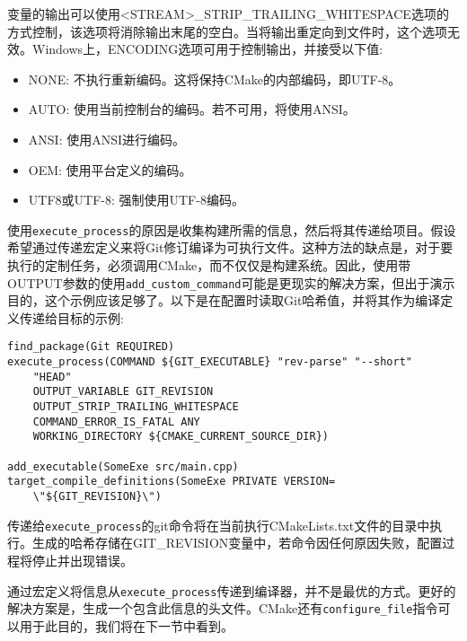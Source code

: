 变量的输出可以使用<STREAM>\_STRIP\_TRAILING\_WHITESPACE选项的方式控制，该选项将消除输出末尾的空白。当将输出重定向到文件时，这个选项无效。Windows上，ENCODING选项可用于控制输出，并接受以下值:

\begin{itemize}
\item 
NONE: 不执行重新编码。这将保持CMake的内部编码，即UTF-8。

\item 
AUTO: 使用当前控制台的编码。若不可用，将使用ANSI。

\item 
ANSI: 使用ANSI进行编码。

\item 
OEM: 使用平台定义的编码。

\item 
UTF8或UTF-8: 强制使用UTF-8编码。
\end{itemize}

使用\texttt{execute\_process}的原因是收集构建所需的信息，然后将其传递给项目。假设希望通过传递宏定义来将Git修订编译为可执行文件。这种方法的缺点是，对于要执行的定制任务，必须调用CMake，而不仅仅是构建系统。因此，使用带OUTPUT参数的使用\texttt{add\_custom\_command}可能是更现实的解决方案，但出于演示目的，这个示例应该足够了。以下是在配置时读取Git哈希值，并将其作为编译定义传递给目标的示例:

\begin{lstlisting}[style=styleCMake]
find_package(Git REQUIRED)
execute_process(COMMAND ${GIT_EXECUTABLE} "rev-parse" "--short"
	"HEAD"
	OUTPUT_VARIABLE GIT_REVISION
	OUTPUT_STRIP_TRAILING_WHITESPACE
	COMMAND_ERROR_IS_FATAL ANY
	WORKING_DIRECTORY ${CMAKE_CURRENT_SOURCE_DIR})

add_executable(SomeExe src/main.cpp)
target_compile_definitions(SomeExe PRIVATE VERSION=
	\"${GIT_REVISION}\")
\end{lstlisting}

传递给\texttt{execute\_process}的git命令将在当前执行CMakeLists.txt文件的目录中执行。生成的哈希存储在GIT\_REVISION变量中，若命令因任何原因失败，配置过程将停止并出现错误。

通过宏定义将信息从\texttt{execute\_process}传递到编译器，并不是最优的方式。更好的解决方案是，生成一个包含此信息的头文件。CMake还有\texttt{configure\_file}指令可以用于此目的，我们将在下一节中看到。

















